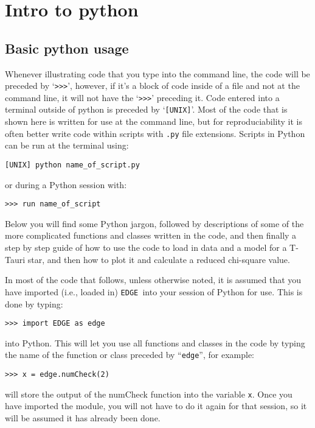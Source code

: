 \documentclass{article}
\newcommand{\edge}{\texttt{EDGE }}
\begin{document}
\section{Intro to python} \label{introtopython}
\subsection{Basic python usage} 
Whenever illustrating code that you type into the command line, the code will be preceded by `\texttt{>>>}', however, if it’s a block of code inside of a file and not at the command line, it will not have the `\texttt{>>>}' preceding it. Code entered into a terminal outside of python is preceded by `\texttt{[UNIX]}'. Most of the code that is shown here is written for use at the command line, but for reproduciability it is often better write code within scripts with \texttt{.py} file extensions. Scripts in Python can be run at the terminal using:

\vspace{2mm}
\texttt{[UNIX] python name\_of\_script.py}
\vspace{2mm}

or during a Python session with:

\vspace{2mm}
\texttt{>>> run name\_of\_script}
\vspace{2mm}

Below you will find some Python jargon, followed by descriptions of some of the more complicated functions and classes written in the code, and then finally a step by step guide of how to use the code to load in data and a model for a T-Tauri star, and then how to plot it and calculate a reduced chi-square value.

In most of the code that follows, unless otherwise noted, it is assumed that you have imported (i.e., loaded in) \edge into your session of Python for use. This is done by typing:

\vspace{2mm}
\texttt{>>> import EDGE as edge}
\vspace{2mm}

\noindent into Python. This will let you use all functions and classes in the code by typing the name of the function or class preceded by “\texttt{edge}”, for example: 

\vspace{2mm} 
\texttt{>>> x = edge.numCheck(2)}
\vspace{2mm}

\noindent will store the output of the numCheck function into the variable \texttt{x}. Once you have imported the module, you will not have to do it again for that session, so it will be assumed it has already been done. 
\end{document}
